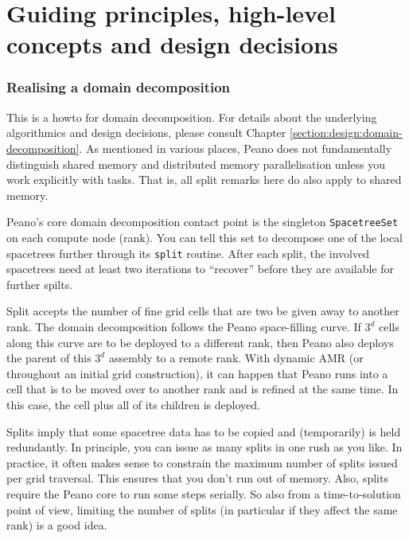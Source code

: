 \chapter{Guiding principles, high-level concepts and design decisions}






\subsection{Realising a domain decomposition}

This is a howto for domain decomposition. 
For details about the underlying algorithmics and design decisions, please
consult Chapter \ref{section:design:domain-decomposition}.
As mentioned in various places, Peano does not fundamentally distinguish shared
memory and distributed memory parallelisation unless you work explicitly with
tasks.
That is, all split remarks here do also apply to shared memory.


Peano's core domain decomposition contact point is the singleton
\texttt{SpacetreeSet} on each compute node (rank).
You can tell this set to decompose one of the local spacetrees further through
its \texttt{split} routine.
After each split, the involved spacetrees need at least two iterations to
``recover'' before they are available for further spilts.


Split accepts the number of fine grid cells that are two be given away to
another rank.
The domain decomposition follows the Peano space-filling curve.
If $3^d$ cells along this curve are to be deployed to a different rank, then
Peano also deploys the parent of this $3^d$ assembly to a remote rank.
With dynamic AMR (or throughout an initial grid construction), it can happen
that Peano runs into a cell that is to be moved over to another rank and is
refined at the same time.
In this case, the cell plus all of its children is deployed.


\begin{remark}
 Splits imply that some spacetree data has to be copied and (temporarily) is
 held redundantly. In principle, you can issue as many splits in one rush as you
 like. In practice, it often makes sense to constrain the maximum number of
 splits issued per grid traversal. This ensures that you don't run out of
 memory. Also, splits require the Peano core to run some steps serially. 
 So also from a time-to-solution point of view, limiting the number of splits
 (in particular if they affect the same rank) is a good idea.
\end{remark}




